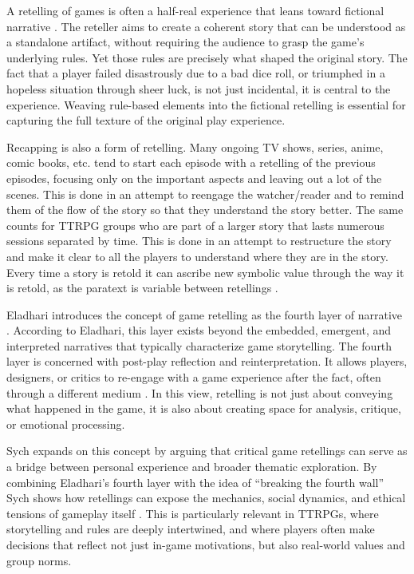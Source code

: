 A retelling of games is often a half-real experience that leans toward fictional narrative \cite{juul2011half}. The reteller aims to create a coherent story that can be understood as a standalone artifact, without requiring the audience to grasp the game's underlying rules. Yet those rules are precisely what shaped the original story. The fact that a player failed disastrously due to a bad dice roll, or triumphed in a hopeless situation through sheer luck, is not just incidental, it is central to the experience. Weaving rule-based elements into the fictional retelling is essential for capturing the full texture of the original play experience.

Recapping is also a form of retelling. Many ongoing TV shows, series, anime, comic books, etc. tend to start each episode with a retelling of the previous episodes, focusing only on the important aspects and leaving out a lot of the scenes. This is done in an attempt to reengage the watcher/reader and to remind them of the flow of the story so that they understand the story better. The same counts for TTRPG groups who are part of a larger story that lasts numerous sessions separated by time. This is done in an attempt to restructure the story and make it clear to all the players to understand where they are in the story. Every time a story is retold it can ascribe new symbolic value through the way it is retold, as the paratext is variable between retellings \cite{gray2010show}. 

Eladhari introduces the concept of game retelling as the fourth layer of narrative \cite{eladhari2018re}. According to Eladhari, this layer exists beyond the embedded, emergent, and interpreted narratives that typically characterize game storytelling. The fourth layer is concerned with post-play reflection and reinterpretation. It allows players, designers, or critics to re-engage with a game experience after the fact, often through a different medium \cite{eladhari2018re}. In this view, retelling is not just about conveying what happened in the game, it is also about creating space for analysis, critique, or emotional processing.

Sych expands on this concept by arguing that critical game retellings can serve as a bridge between personal experience and broader thematic exploration. By combining Eladhari's fourth layer with the idea of “breaking the fourth wall” Sych shows how retellings can expose the mechanics, social dynamics, and ethical tensions of gameplay itself \cite{sych2020fourth}. This is particularly relevant in TTRPGs, where storytelling and rules are deeply intertwined, and where players often make decisions that reflect not just in-game motivations, but also real-world values and group norms.

